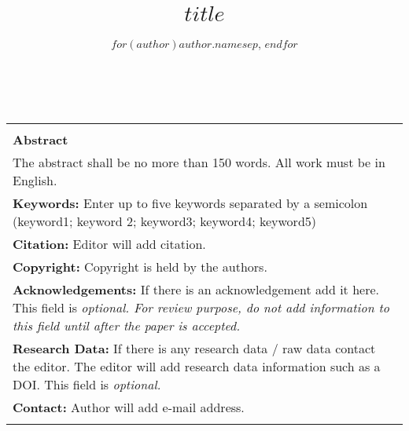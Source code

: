 \documentclass[10pt, letterpaper]{article}
\title{$title$}
\date{} %
\author{$for(author)$$author.name$$sep$, $endfor$}
\makeatletter
\renewcommand{\maketitle}{\bgroup\setlength{\parindent}{0pt}
\begin{flushleft}
  {\sffamily \Large {\@title} }
  \vspace{12pt}\\
  \@author
\end{flushleft}\egroup
}
\makeatother
\begin{document}
\newenvironment{blockquote}{\list{}{\leftmargin=0.5in\rightmargin=0.0in}\item[]}{\endlist}
\renewcommand{\listfigurename}{Table of Figures} 
\renewcommand{\listtablename}{Table of Tables} 
\maketitle %
\thispagestyle{empty} %


\begin{center}
\begin{tabularx}{\textwidth}{|X|}
\hline
\vspace{2pt}\\
\textbf{Abstract}\\
The abstract shall be no more than 150 words.  All work must be in English.\\
{\footnotesize \textbf{Keywords:} Enter up to five keywords separated by a semicolon (keyword1; keyword 2; keyword3; keyword4; keyword5)}\\
{\footnotesize \textbf{Citation:}  Editor will add citation.}\\
{\footnotesize \textbf{Copyright:} Copyright is held by the authors.}\\
{\footnotesize \textbf{Acknowledgements:} If there is an acknowledgement add it here. This field is \em{optional}. For review purpose, do not add information to this field until after the paper is accepted.}\\ %
{\footnotesize \textbf{Research Data:}  If there is any research data / raw data contact the editor. The editor will add research data information such as a DOI. This field is \em{optional}.} \\ %
{\footnotesize \textbf{Contact:} Author will add e-mail address.}\\ %
\vspace{2pt}\\
\hline
\end{tabularx}
\end{center}
\end{document}

